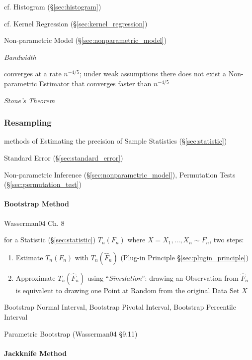 cf. Histogram (\S\ref{sec:histogram})

cf. Kernel Regression (\S\ref{sec:kernel_regression})

Non-parametric Model (\S\ref{sec:nonparametric_model})

\emph{Bandwidth}

converges at a rate $n^{-4/5}$;
under weak assumptions there does not exist a Non-parametric Estimator that
converges faster than $n^{-4/5}$

\emph{Stone's Theorem}



\subsubsection{Resampling}\label{sec:resampling}

methods of Estimating the precision of Sample Statistics (\S\ref{sec:statistic})

\fist Standard Error (\S\ref{sec:standard_error})

Non-parametric Inference (\S\ref{sec:nonparametric_model}), Permutation Tests
(\S\ref{sec:permutation_test})



\paragraph{Bootstrap Method}\label{sec:bootstrap_method}\hfill

Wasserman04 Ch. 8

for a Statistic (\S\ref{sec:statistic}) $T_n(F_n)$ where
$X = X_1, \ldots, X_n \sim F_n$, two steps:
\begin{enumerate}
  \item Estimate $T_n(F_n)$ with $T_n(\hat{F}_n)$ (Plug-in Principle
    \S\ref{sec:plugin_principle})
  \item Approximate $T_n(\hat{F}_n)$ using ``\emph{Simulation}'': drawing an
    Observation from $\hat{F}_n$ is equivalent to drawing one Point at Random
    from the original Data Set $X$
\end{enumerate}

Bootstrap Normal Interval, Bootstrap Pivotal Interval, Bootstrap Percentile
Interval

Parametric Bootstrap (Wasserman04 \S9.11)



\paragraph{Jackknife Method}\label{sec:jackknife_method}\hfill



